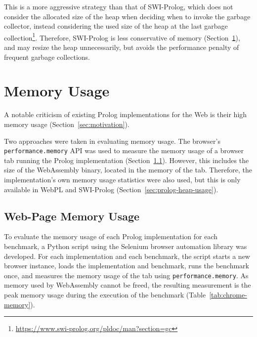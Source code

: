 This is a more aggressive strategy than that of SWI-Prolog, which does not consider the allocated size of the heap when deciding when to invoke the garbage collector, instead considering the used size of the heap at the last garbage collection\footnote{\url{https://www.swi-prolog.org/pldoc/man?section=gc}}. Therefore, SWI-Prolog is less conservative of memory (Section~\ref{sec:memory-usage}), and may resize the heap unnecessarily, but avoids the performance penalty of frequent garbage collections.

\section{Memory Usage}

\label{sec:memory-usage}

A notable criticism of existing Prolog implementations for the Web is their high memory usage (Section~\ref{sec:motivation}).

Two approaches were taken in evaluating memory usage. The browser's \texttt{performance.memory} API was used to measure the memory usage of a browser tab running the Prolog implementation (Section~\ref{sec:web-page-memory-usage}). However, this includes the size of the WebAssembly binary, located in the memory of the tab. Therefore, the implementation's own memory usage statistics were also used, but this is only available in WebPL and SWI-Prolog (Section~\ref{sec:prolog-heap-usage}).

\subsection{Web-Page Memory Usage}

\label{sec:web-page-memory-usage}

To evaluate the memory usage of each Prolog implementation for each benchmark, a Python script using the Selenium browser automation library \cite{softwarefreedomconservancySeleniumhttpsgithubcom2025} was developed. For each implementation and each benchmark, the script starts a new browser instance, loads the implementation and benchmark, runs the benchmark once, and measures the memory usage of the tab using \texttt{performance.memory}. As memory used by WebAssembly cannot be freed, the resulting measurement is the peak memory usage during the execution of the benchmark (Table~\ref{tab:chrome-memory}).

